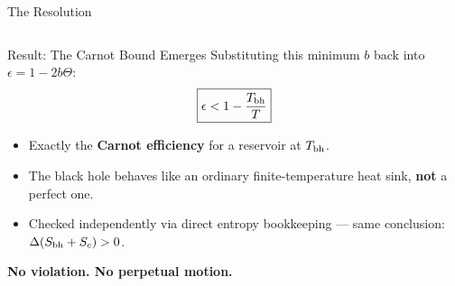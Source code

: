 \documentclass[aspectratio=169]{beamer}
\begin{document}
\begin{frame}{The Resolution}
\begin{columns}[c]
\end{columns}
\end{frame}


\begin{frame}{Result: The Carnot Bound Emerges}
Substituting this minimum $b$ back into $\epsilon = 1-2b\Theta$:
\[
\boxed{\epsilon < 1-\frac{T_{\rm bh}}{T}}
\]
\begin{itemize}
    \item Exactly the \textbf{Carnot efficiency} for a reservoir at $T_{\rm bh}$.
    \item The black hole behaves like an ordinary finite-temperature heat sink, \textbf{not} a perfect one.
    \item Checked independently via direct entropy bookkeeping — same conclusion: $\Delta(S_{\rm bh}+S_c)>0$.
\end{itemize}
\centering
\textbf{No violation. No perpetual motion.}
\end{frame}


\end{document}
